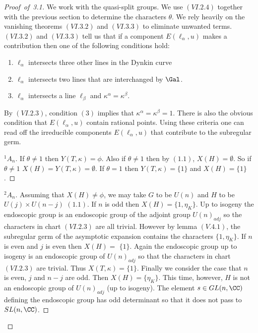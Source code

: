 \documentclass{memo-l}
\theoremstyle{definition}
\theoremstyle{remark}
\numberwithin{section}{chapter}
\numberwithin{equation}{chapter}
\begin{document}
\begin{proof}[Proof\ of\ 3.1] We work with the quasi-split groups.  We use
$(VI.2.4)$ together with the previous section to determine the characters
${\theta}$.  We rely heavily on the vanishing theorems $(VI.3.2)$ and
$(VI.3.3)$ to eliminate unwanted terms.  $(VI.3.2)$ and $(VI.3.3)$ tell us
that if a component $E({\ell}_{{\alpha}},u)$ makes a contribution then one
of the following conditions hold:
\begin{enumerate}[label=\arabic*)]
\item ${\ell}_{{\alpha}}$ intersects three other lines in the Dynkin curve
\item ${\ell}_{{\alpha}}$ intersects two lines that are interchanged by
$\Gal$.
\item ${\ell}_{{\alpha}}$ intersects a line ${\ell}_{{\beta}}$ and
${\kappa}^{{\alpha}} = {\kappa}^{{\beta}}$.
\end{enumerate}

\noindent
By $(VI.2.3)$, condition $(3)$ implies that
${\kappa}^{{\alpha}} = {\kappa}^{{\beta}} = 1$.  There is also the obvious
condition that $E({\ell}_{{\alpha}},u)$ contain rational points.  Using
these criteria one can read off the irreducible components
$E({\ell}_{{\alpha}},u)$ that contribute to the subregular germ.

\begin{proof}[${}^{1}A_{n}$] If ${\theta} \ne 1$ then $Y(T,{\kappa})  =  {\phi}$.  Also if
${\theta} \ne 1$ then by $(1.1)$,  $X(H) = {\emptyset}$.  So if ${\theta} \ne
1$ $ X(H) = Y(T,{\kappa}) = {\emptyset}$.  If ${\theta} = 1$ then $Y(T,{\kappa}) = \{1\}$ and
$X(H) = \{1\}$.
\phantom\qedhere
\end{proof}


\begin{proof}[${}^{2}A_{n}$]  Assuming that $X(H)  \ne {\phi}$, we may take $G$ to
be $U(n)$ and $H$ to be $U(j) \times U(n-j)$ $(1.1)$.  If $n$ is odd then
$X(H)  =  \{1,{\eta}_{K}\}$.  Up to isogeny the
endoscopic group is an endoscopic group of the adjoint group $U(n)_{adj}$ so
the characters in chart $(VI.2.3)$ are all trivial.  However by lemma
$(V.4.1)$, the subregular germ of the asymptotic expansion contains the
characters $\{1,{\eta}_{K}\}$.  If $n$ is even and $j$ is even then $X(H)
 = $ $\{1\}$.  Again the endoscopic group up to isogeny
is an endoscopic group of $U(n)_{adj}$ so that the characters in chart
$(VI.2.3)$ are trivial.  Thus $X(T,{\kappa})  =  \{1\}$.  Finally we consider
the case that $n$ is even, $j$ and $n-j$ are odd.  Then $X(H)  =
\{{\eta}_{K}\}$.  This time, however, $H$ is not an endoscopic group of
$U(n)_{adj}$ (up to isogeny).  The element $s  \in
GL(n,{\CC})$ defining the endoscopic group has odd determinant so that
it does not pass to $SL(n,{\CC})$.


\end{proof}
\end{proof}
\end{document}

